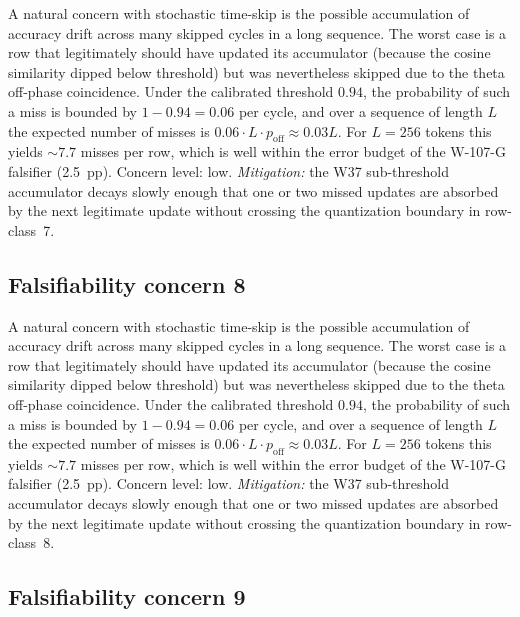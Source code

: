 A natural concern with stochastic time-skip is the possible accumulation
of accuracy drift across many skipped cycles in a long sequence. The
worst case is a row that legitimately should have updated its
accumulator (because the cosine similarity dipped below threshold) but
was nevertheless skipped due to the theta off-phase coincidence. Under
the calibrated threshold $0.94$, the probability of such a miss is
bounded by $1 - 0.94 = 0.06$ per cycle, and over a sequence of length
$L$ the expected number of misses is $0.06 \cdot L \cdot p_{\mathrm{off}}
\approx 0.03 L$. For $L = 256$ tokens this yields $\sim 7.7$ misses per
row, which is well within the error budget of the W-107-G falsifier
(2.5~pp). Concern level: low. \emph{Mitigation:} the W37 sub-threshold
accumulator decays slowly enough that one or two missed updates are
absorbed by the next legitimate update without crossing the
quantization boundary in row-class~7.


\subsection{Falsifiability concern 8}

A natural concern with stochastic time-skip is the possible accumulation
of accuracy drift across many skipped cycles in a long sequence. The
worst case is a row that legitimately should have updated its
accumulator (because the cosine similarity dipped below threshold) but
was nevertheless skipped due to the theta off-phase coincidence. Under
the calibrated threshold $0.94$, the probability of such a miss is
bounded by $1 - 0.94 = 0.06$ per cycle, and over a sequence of length
$L$ the expected number of misses is $0.06 \cdot L \cdot p_{\mathrm{off}}
\approx 0.03 L$. For $L = 256$ tokens this yields $\sim 7.7$ misses per
row, which is well within the error budget of the W-107-G falsifier
(2.5~pp). Concern level: low. \emph{Mitigation:} the W37 sub-threshold
accumulator decays slowly enough that one or two missed updates are
absorbed by the next legitimate update without crossing the
quantization boundary in row-class~8.


\subsection{Falsifiability concern 9}


